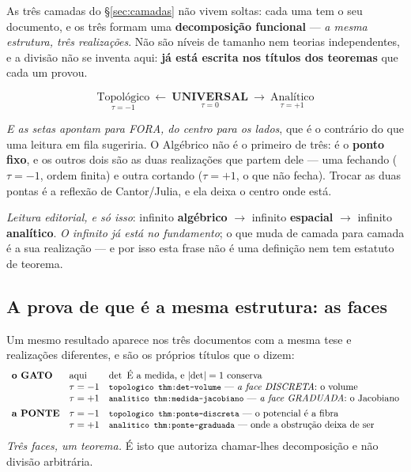 \documentclass[11pt,a4paper]{article}
\newcommand{\code}[1]{\texttt{\small #1}}
\newcommand{\abs}[1]{\lvert #1\rvert}
\begin{document}
As três camadas do \S\ref{sec:camadas} não vivem soltas: cada uma tem o seu documento, e
os três formam uma \textbf{decomposição funcional} --- \emph{a mesma estrutura, três
realizações}. Não são níveis de tamanho nem teorias independentes, e a divisão não se
inventa aqui: \textbf{já está escrita nos títulos dos teoremas} que cada um provou.

\[
\boxed{\;\underset{\tau=-1}{\text{Topológico}}\ \longleftarrow\ \underset{\tau=0}{\textbf{UNIVERSAL}}\ \longrightarrow\ \underset{\tau=+1}{\text{Analítico}}\;}
\]

\noindent\emph{E as setas apontam para FORA, do centro para os lados}, que é o contrário
do que uma leitura em fila sugeriria. O Algébrico não é o primeiro de três: é o
\textbf{ponto fixo}, e os outros dois são as duas realizações que partem dele --- uma
fechando ($\tau=-1$, ordem finita) e outra cortando ($\tau=+1$, o que não fecha). Trocar as
duas pontas é a reflexão de Cantor/Julia, e ela deixa o centro onde está.

\noindent\emph{Leitura editorial, e só isso}: infinito \textbf{algébrico}
$\to$ infinito \textbf{espacial} $\to$ infinito \textbf{analítico}. \emph{O infinito já
está no fundamento}; o que muda de camada para camada é a sua realização --- e por isso
esta frase não é uma definição nem tem estatuto de teorema.

\subsection*{A prova de que é a mesma estrutura: as faces}

Um mesmo resultado aparece nos três documentos com a mesma tese e realizações
diferentes, e são os próprios títulos que o dizem:
\[
\begin{array}{lll}
\textbf{o GATO} & \text{aqui} & \det\ \text{É a medida, e }\abs{\det}=1\text{ conserva}\\
 & \tau=-1 & \code{topologico thm:det-volume} \text{ --- \emph{a face DISCRETA}: o volume}\\
 & \tau=+1 & \code{analitico thm:medida-jacobiano} \text{ --- \emph{a face GRADUADA}: o Jacobiano}\\[4pt]
\textbf{a PONTE} & \tau=-1 & \code{topologico thm:ponte-discreta} \text{ --- o potencial é a fibra}\\
 & \tau=+1 & \code{analitico thm:ponte-graduada} \text{ --- onde a obstrução deixa de ser}
\end{array}
\]
\emph{Três faces, um teorema.} É isto que autoriza chamar-lhes decomposição e não divisão
arbitrária.
\end{document}
